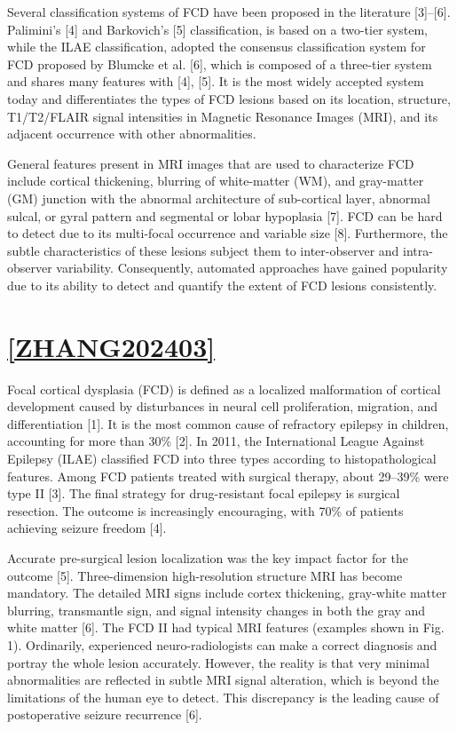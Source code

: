 Several classification systems of FCD have been proposed in the literature [3]–[6]. Palimini's [4] and Barkovich's [5] classification, is based on a two-tier system, while the ILAE classification, adopted the consensus classification system for FCD proposed by Blumcke et al. [6], which is composed of a three-tier system and shares many features with [4], [5]. It is the most widely accepted system today and differentiates the types of FCD lesions based on its location, structure, T1/T2/FLAIR signal intensities in Magnetic Resonance Images (MRI), and its adjacent occurrence with other abnormalities.

General features present in MRI images that are used to characterize FCD include cortical thickening, blurring of white-matter (WM), and gray-matter (GM) junction with the abnormal architecture of sub-cortical layer, abnormal sulcal, or gyral pattern and segmental or lobar hypoplasia [7]. FCD can be hard to detect due to its multi-focal occurrence and variable size [8]. Furthermore, the subtle characteristics of these lesions subject them to inter-observer and intra-observer variability. Consequently, automated approaches have gained popularity due to its ability to detect and quantify the extent of FCD lesions consistently.

\section{\href{https://pmc.ncbi.nlm.nih.gov/articles/PMC10933224/}{[ZHANG202403]}}

Focal cortical dysplasia (FCD) is defined as a localized malformation of cortical development caused by disturbances in neural cell proliferation, migration, and differentiation [1]. It is the most common cause of refractory epilepsy in children, accounting for more than 30\% [2]. In 2011, the International League Against Epilepsy (ILAE) classified FCD into three types according to histopathological features. Among FCD patients treated with surgical therapy, about 29–39\% were type II [3]. The final strategy for drug-resistant focal epilepsy is surgical resection. The outcome is increasingly encouraging, with 70\% of patients achieving seizure freedom [4].

Accurate pre-surgical lesion localization was the key impact factor for the outcome [5]. Three-dimension high-resolution structure MRI has become mandatory. The detailed MRI signs include cortex thickening, gray-white matter blurring, transmantle sign, and signal intensity changes in both the gray and white matter [6]. The FCD II had typical MRI features (examples shown in Fig. 1). Ordinarily, experienced neuro-radiologists can make a correct diagnosis and portray the whole lesion accurately. However, the reality is that very minimal abnormalities are reflected in subtle MRI signal alteration, which is beyond the limitations of the human eye to detect. This discrepancy is the leading cause of postoperative seizure recurrence [6].

